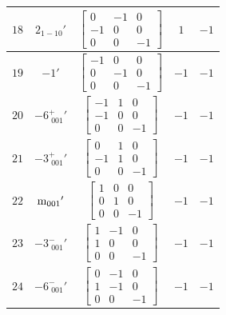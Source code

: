 \documentclass[fleqn,8pt]{jsarticle}
\begin{document}
\begin{longtable}{ccccc}
$ 18 $ & $ 2{}_{1-10}{}' $ & $ \begin{bmatrix} 0 & -1 & 0 \\ -1 & 0 & 0 \\ 0 & 0 & -1 \end{bmatrix} $ & $ 1 $ & $ -1 $ \\ \hline
$ 19 $ & $ -1{}' $ & $ \begin{bmatrix} -1 & 0 & 0 \\ 0 & -1 & 0 \\ 0 & 0 & -1 \end{bmatrix} $ & $ -1 $ & $ -1 $ \\ \hline
$ 20 $ & $ -6^{+}_{\,\,001}{}' $ & $ \begin{bmatrix} -1 & 1 & 0 \\ -1 & 0 & 0 \\ 0 & 0 & -1 \end{bmatrix} $ & $ -1 $ & $ -1 $ \\ \hline
$ 21 $ & $ -3^{+}_{\,\,001}{}' $ & $ \begin{bmatrix} 0 & 1 & 0 \\ -1 & 1 & 0 \\ 0 & 0 & -1 \end{bmatrix} $ & $ -1 $ & $ -1 $ \\ \hline
$ 22 $ & $ {\rm m}_{001}{}' $ & $ \begin{bmatrix} 1 & 0 & 0 \\ 0 & 1 & 0 \\ 0 & 0 & -1 \end{bmatrix} $ & $ -1 $ & $ -1 $ \\ \hline
$ 23 $ & $ -3^{-}_{\,\,001}{}' $ & $ \begin{bmatrix} 1 & -1 & 0 \\ 1 & 0 & 0 \\ 0 & 0 & -1 \end{bmatrix} $ & $ -1 $ & $ -1 $ \\ \hline
$ 24 $ & $ -6^{-}_{\,\,001}{}' $ & $ \begin{bmatrix} 0 & -1 & 0 \\ 1 & -1 & 0 \\ 0 & 0 & -1 \end{bmatrix} $ & $ -1 $ & $ -1 $ \\
\end{longtable}
\end{document}
